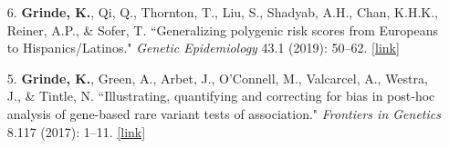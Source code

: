 \documentclass[margin]{res}
\newcommand{\annotateItem}[1]{
	\begin{itemize} \vspace{-0.1cm}
	\item[] 
	\begin{footnotesize}\textcolor{black}{(#1)}\end{footnotesize}
	\end{itemize} \vspace{-0.1cm}
}
\begin{document}
\begin{resume}
\begin{itemize}
\item[6.] \textbf{Grinde, K.}, Qi, Q., Thornton, T., Liu, S., Shadyab, A.H., Chan, K.H.K., Reiner, A.P., \& Sofer, T. ``Generalizing polygenic risk scores from Europeans to Hispanics/Latinos." \textit{Genetic Epidemiology} 43.1 (2019): 50--62. 
\href{https://onlinelibrary.wiley.com/doi/abs/10.1002/gepi.22166}{[link]}
 
\item[5.] \textbf{Grinde, K.}, Green, A., Arbet, J., O'Connell, M., Valcarcel, A., Westra, J., \& Tintle, N. ``Illustrating, quantifying and correcting for bias in post-hoc analysis of gene-based rare variant tests of association." \textit{Frontiers in Genetics} 8.117 (2017): 1--11. 
\href{https://www.frontiersin.org/articles/10.3389/fgene.2017.00117/full}{[link]}
	

\end{itemize}
\end{resume}
\end{document}

